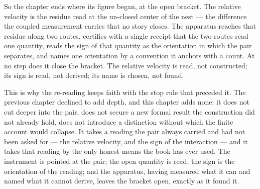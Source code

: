 So the chapter ends where its figure began, at the open bracket. The relative velocity is the
residue read at the un-closed center of the nest --- the difference the coupled measurement carries
that no story closes. The apparatus reaches that residue along two routes, certifies with a single
receipt that the two routes read one quantity, reads the sign of that quantity as the orientation in
which the pair separates, and names one orientation by a convention it anchors with a count. At no
step does it close the bracket. The relative velocity is read, not constructed; its sign is read,
not derived; its name is chosen, not found.

This is why the re-reading keeps faith with the stop rule that preceded it. The previous chapter
declined to add depth, and this chapter adds none: it does not cut deeper into the pair, does not
secure a new formal result the construction did not already hold, does not introduce a distinction
without which the finite account would collapse. It takes a reading the pair always carried and had
not been asked for --- the relative velocity, and the sign of the interaction --- and it takes that
reading by the only honest means the book has ever used. The instrument is pointed at the pair; the
open quantity is read; the sign is the orientation of the reading; and the apparatus, having
measured what it can and named what it cannot derive, leaves the bracket open, exactly as it found
it.
